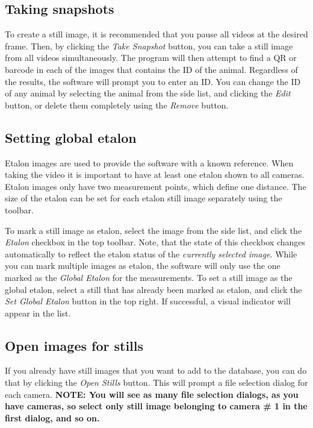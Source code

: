 \documentclass[10pt,a4paper,oneside]{report}             %
\newcommand*{\img}[1]{%
	\raisebox{-.02\baselineskip}{%
		\texttt{[image: \#1]}%
	}%
}
\begin{document}
\subsection{Taking snapshots}

To create a still image, it is recommended that you pause all videos at the desired frame. Then, by clicking the \textit{Take Snapshot} \img{../VAM/Icons/1462024260_Camera.png} button, you can take a still image from all videos simultaneously. The program will then attempt to find a QR or barcode in each of the images that contains the ID of the animal. Regardless of the results, the software will prompt you to enter an ID. You can change the ID of any animal by selecting the animal from the side list, and clicking the \textit{Edit} \img{../VAM/Icons/1462036358_edit.png} button, or delete them completely using the \textit{Remove} \img{../VAM/Icons/1462036183_document-delete3.png} button.

\subsection{Setting global etalon}

Etalon images are used to provide the software with a known reference. When taking the video it is important to have at least one etalon shown to all cameras. Etalon images only have two measurement points, which define one distance. The size of the etalon can be set for each etalon still image separately using the toolbar.

To mark a still image as etalon, select the image from the side list, and click the \textit{Etalon} checkbox in the top toolbar. Note, that the state of this checkbox changes automatically to reflect the etalon status of the \textit{currently selected image}. While you can mark multiple images as etalon, the software will only use the one marked as the \textit{Global Etalon} for the measurements. To set a still image as the global etalon, select a still that has already been marked as etalon, and click the \textit{Set Global Etalon} \img{../VAM/Icons/1462455465_centimeter.png} button in the top right. If successful, a visual indicator will appear in the list.

\subsection{Open images for stills} \label{sec:openStill}

If you already have still images that you want to add to the database, you can do that by clicking the \textit{Open Stills} \img{../VAM/Icons/1462367694_folder_open-add2.png} button. This will prompt a file selection dialog for each camera. \textbf{NOTE: You will see as many file selection dialogs, as you have cameras, so select only still image belonging to camera \# 1 in the first dialog, and so on.}
\end{document}
